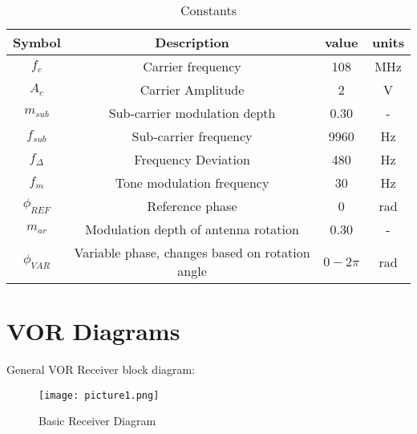 \documentclass[12pt]{article}
\begin{document}
\begin{table}[ht]
\begin{tabular}{|c|c|c|c|}
\hline
\textbf{Symbol}               & \textbf{Description}                            & \textbf{value}        & \textbf{units} \\ \hline
$f_c$                          & Carrier frequency                               & 108                   & MHz            \\ \hline
$A_c$                          & Carrier Amplitude                               & 2                     & V              \\ \hline
$m_{sub}$                        & Sub-carrier modulation depth                    & 0.30                  &       -         \\ \hline
$f_{sub}$                        & Sub-carrier frequency                           & 9960                  & Hz             \\ \hline
$f_{\Delta}$                    & Frequency Deviation                             & 480                   & Hz             \\ \hline
$f_m$                          & Tone modulation frequency                       & 30                    & Hz             \\ \hline
$\phi_{REF}$  & Reference phase                                 & 0                     & rad            \\ \hline
$m_{ar}$                         & Modulation depth of antenna rotation            & 0.30                  &         -       \\ \hline
$\phi_{VAR}$ & Variable phase, changes based on rotation angle & $0-2\pi$ & rad            \\ \hline
\end{tabular}
\caption{Constants}
\label{table:data}
\end{table}

\section{VOR Diagrams}%
General VOR Receiver block diagram:
\begin{figure}[htp]
    \centering
    \texttt{[image: picture1.png]}
    \caption{Basic Receiver Diagram}
    \label{fig:receive_block}
\end{figure}
\end{document}
